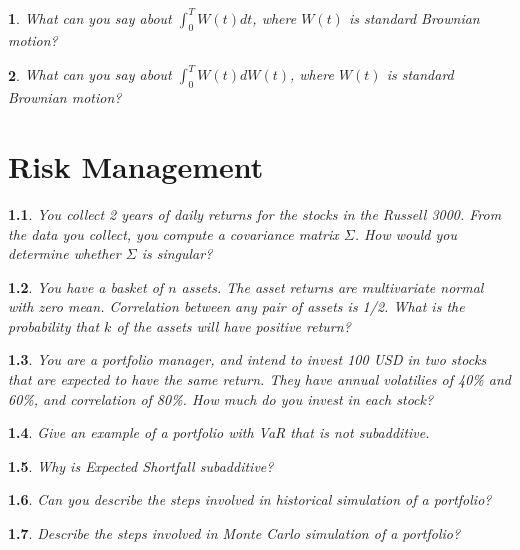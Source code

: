 \documentclass{report}
\newtheorem{problem}{}
\numberwithin{problem}{chapter} %
\begin{document}
\begin{problem}
\cite{CRACK} What can you say about $\int_0^{T} W(t)dt$, where $W(t)$ is standard Brownian motion?
\end{problem}

\begin{problem}
\cite{CRACK} What can you say about $\int_0^{T} W(t)dW(t)$, where $W(t)$ is standard Brownian motion?
\end{problem}

\chapter{Risk Management}

\begin{problem}
You collect 2 years of daily returns for the stocks in the Russell 3000. From the data you collect, you compute a covariance matrix $\Sigma$. How would you determine whether $\Sigma$ is singular?
\end{problem}

\begin{problem}
You have a basket of $n$ assets. The asset returns are multivariate normal with zero mean. Correlation between any pair of assets is 1/2. What is the probability that $k$ of the assets will have positive return?
\end{problem}

\begin{problem}
\cite{CRACK} You are a portfolio manager, and intend to invest 100 USD in two stocks that are expected to have the same return. They have annual volatilies of 40\% and 60\%, and correlation of 80\%.  How much do you invest in each stock?
\end{problem}

\begin{problem}
Give an example of a portfolio with VaR that is not subadditive.
\end{problem}

\begin{problem}
Why is Expected Shortfall subadditive?
\end{problem}

\begin{problem}
Can you describe the steps involved in historical simulation of a portfolio?
\end{problem}

\begin{problem}
Describe the steps involved in Monte Carlo simulation of a portfolio?
\end{problem}
\end{document}
